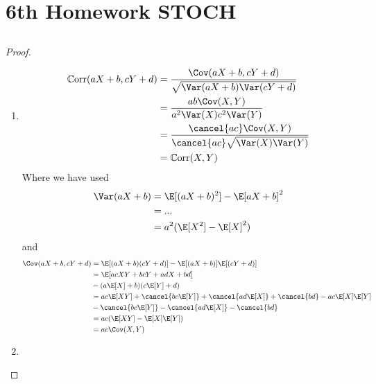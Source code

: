 
\section{6th Homework STOCH}
\subsection{}
\begin{proof}
	\begin{enumerate}
		\item \begin{align*}
			\Corr(aX + b,cY+d) &= \frac{\Cov(aX+b, cY+d)}{\sqrt{\Var(aX+b)\Var(cY+d)}}\\
			&= \frac{ab\Cov(X,Y)}{a^2\Var(X)c^2\Var(Y)}\\
			&= \frac{\cancel{ac}\Cov(X,Y)}{\cancel{ac}\sqrt{\Var(X)\Var(Y)}}\\
			&= \Corr(X,Y)
		\end{align*}
		Where we have used
		\begin{align*}
			\Var(aX+b) &= \E[(aX+b)^2]- \E[aX+b]^2\\
			&= ...\\ %
			&= a^2(\E[X^2] - \E[X]^2)
		\end{align*}
		and 
		\begin{align*}
			\Cov(aX+b,cY+d) &= \E[(aX+b)(cY+d)]-\E[(aX+b)]\E[(cY+d)]\\
			&= \E[acXY + bcY + adX + bd] \\
			&- (a\E[X]+b)(c\E[Y]+d)\\
			&= ac\E[XY]+\cancel{bc\E[Y]} + \cancel{ad\E[X]} + \cancel{bd} - ac\E[X]\E[Y]\\
			&- \cancel{bc \E[Y]} - \cancel{ad\E[X]} - \cancel{bd}\\
			&= ac(\E[XY] - \E[X]\E[Y])\\
			&= ac\Cov(X,Y)
		\end{align*}
		\item 
	\end{enumerate}
\end{proof}

